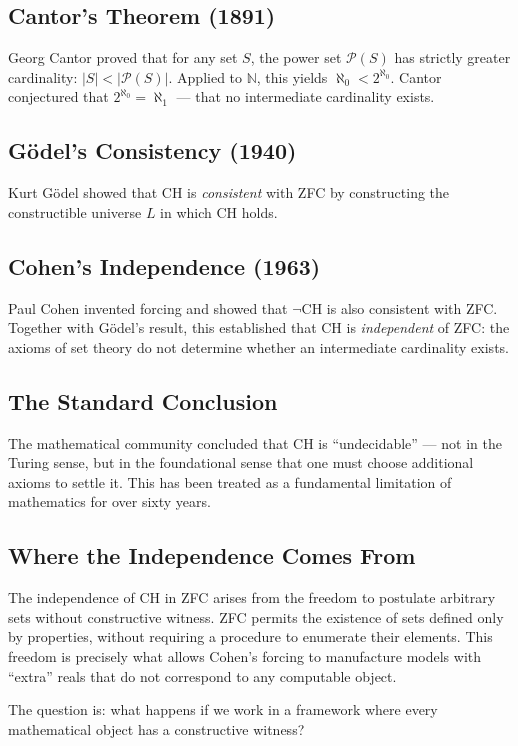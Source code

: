 \documentclass{report}
\begin{document}
\subsection{Cantor's Theorem (1891)}
Georg Cantor proved that for any set $S$, the power set $\mathcal{P}(S)$ has
strictly greater cardinality: $|S| < |\mathcal{P}(S)|$. Applied to $\mathbb{N}$,
this yields $\aleph_0 < 2^{\aleph_0}$. Cantor conjectured that $2^{\aleph_0} =
\aleph_1$ --- that no intermediate cardinality exists.

\subsection{G\"odel's Consistency (1940)}
Kurt G\"odel showed that CH is \emph{consistent} with ZFC by constructing the
constructible universe $L$ in which CH holds.

\subsection{Cohen's Independence (1963)}
Paul Cohen invented forcing and showed that $\neg$CH is also consistent with
ZFC. Together with G\"odel's result, this established that CH is \emph{independent}
of ZFC: the axioms of set theory do not determine whether an intermediate
cardinality exists.

\subsection{The Standard Conclusion}
The mathematical community concluded that CH is ``undecidable'' --- not in the
Turing sense, but in the foundational sense that one must choose additional
axioms to settle it. This has been treated as a fundamental limitation of
mathematics for over sixty years.

\subsection{Where the Independence Comes From}
The independence of CH in ZFC arises from the freedom to postulate arbitrary
sets without constructive witness. ZFC permits the existence of sets defined
only by properties, without requiring a procedure to enumerate their elements.
This freedom is precisely what allows Cohen's forcing to manufacture models
with ``extra'' reals that do not correspond to any computable object.

The question is: what happens if we work in a framework where every
mathematical object has a constructive witness?
\end{document}
